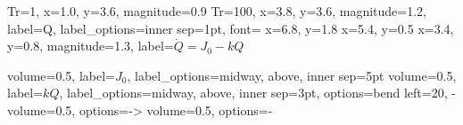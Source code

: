 \documentclass{standalone}
\begin{document}
\begin{energese}[background rectangle/.style={fill={rgb,255:red,237;green,237;blue,234}}, show background rectangle]

     {Tr=1,   x=1.0, y=3.6, magnitude=0.9}
     {Tr=100, x=3.8, y=3.6, magnitude=1.2,
                          label={Q}, label_options={inner sep=1pt, font=\sffamily\large}}
      {x=6.8, y=1.8}
     {x=5.4, y=0.5}
     {x=3.4, y=0.8, magnitude=1.3, label={$\dot{Q} = J_0 - kQ$}}

           {volume=0.5, label={$J_0$},
                                    label_options={midway, above, inner sep=5pt}}
        {volume=0.5, label={$kQ$},
                                    label_options={midway, above, inner sep=3pt},
                                    options={bend left=20, -}}
      {volume=0.5, options={->}}
       {volume=0.5, options={-}}
\end{energese}
\end{document}
